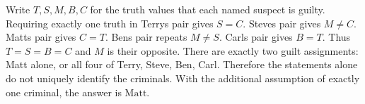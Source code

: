 Write $T,S,M,B,C$ for the truth values that each named suspect is guilty. Requiring exactly one truth in Terry\textquotesingle s pair gives $S=C$. Steve\textquotesingle s pair gives $M\ne C$. Matt\textquotesingle s pair gives $C=T$. Ben\textquotesingle s pair repeats $M\ne S$. Carl\textquotesingle s pair gives $B=T$. Thus $T=S=B=C$ and $M$ is their opposite. There are exactly two guilt assignments: Matt alone, or all four of Terry, Steve, Ben, Carl. Therefore the statements alone do not uniquely identify the criminals. With the additional assumption of exactly one criminal, the answer is $\boxed{\text{Matt}}$.
